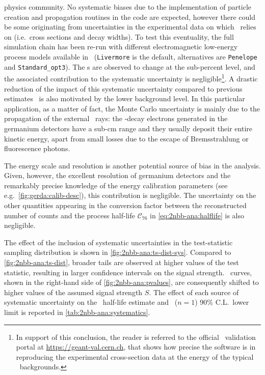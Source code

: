 \begin{description}[wide]
    physics community. No systematic biases due to the implementation of particle creation
    and propagation routines in the code are expected, however there could be some
    originating from uncertainties in the experimental data on which \geant\ relies on
    (i.e.~cross sections and decay widths). To test this eventuality, the full simulation
    chain has been re-run with different electromagnetic low-energy process models
    available in \geant\ (\texttt{Livermore} is the default, alternatives are
    \texttt{Penelope} and \texttt{Standard\_opt3}). The \pdf{}s are observed to change at the
    sub-percent level, and the associated contribution to the systematic uncertainty is
    negligible\footnote{%
      In support of this conclusion, the reader is referred to the official \geant\
      validation portal at \url{https://geant-val.cern.ch}, that shows how precise the
      software is in reproducing the experimental cross-section data at the energy of
      the typical \gerda\ backgrounds.
    }. A drastic reduction of the impact of this systematic uncertainty compared to
    previous estimates~\cite{Agostini2012a} is also motivated by the lower background
    level. In this particular application, as a matter of fact, the Monte Carlo
    uncertainty is mainly due to the propagation of the external \g\ rays: the \nnbb-decay
    electrons generated in the germanium detectors have a sub-cm range and they usually
    deposit their entire kinetic energy, apart from small losses due to the escape of
    Bremsstrahlung or fluorescence photons.

  \item[Other sources] The energy scale and resolution is another potential source of
    bias in the analysis. Given, however, the excellent resolution of germanium detectors
    and the remarkably precise knowledge of the energy calibration parameters (see
    e.g.~\cref{fig:gerda:calib-desc}), this contribution is negligible. The uncertainty on
    the other quantities appearing in the conversion factor between the reconstructed
    number of counts and the process half-life $\mathcal{C}_{76}$ in
    \cref{eq:2nbb-ana:halflife} is also negligible.

\end{description}

The effect of the inclusion of systematic uncertainties in the test-statistic sampling
distribution is shown in \cref{fig:2nbb-ana:ts-dist-sys}. Compared to
\cref{fig:2nbb-ana:ts-dist}, broader tails are observed at higher values of the test
statistic, resulting in larger confidence intervals on the signal strength. \pvalue\
curves, shown in the right-hand side of \cref{fig:2nbb-ana:pvalues}, are consequently
shifted to higher values of the assumed signal strength $S$. The effect of each source of
systematic uncertainty on the \nnbb\ half-life estimate and \onbbx\ ($n=1$) 90\%
C.L.~lower limit is reported in \cref{tab:2nbb-ana:systematics}.

